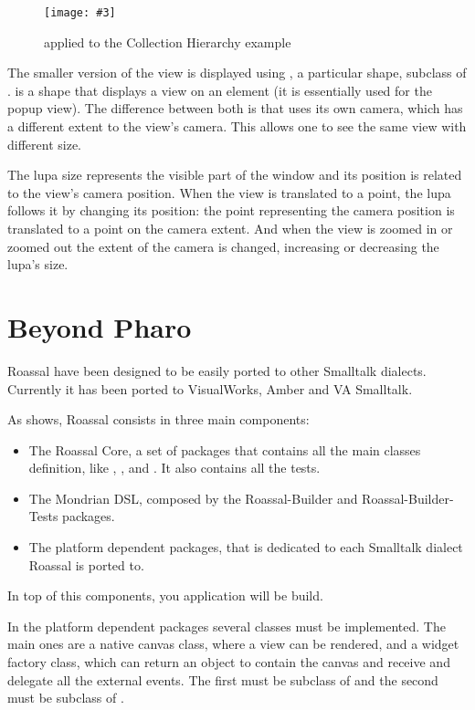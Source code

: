 \documentclass[a4paper,10pt,twoside]{book}
\newcommand{\fig}[4]{
		\begin{figure}[#1]
			\centering
			\texttt{[image: \#3]}
			\caption{\label{fig:#3}#4}
		\end{figure}}
\begin{document}
\fig{H}{0.9}{miniMap}{ applied to the Collection Hierarchy example}

The smaller version of the view is displayed using , a particular shape, subclass of . 
 is a shape that displays a view on an element (it is essentially used for the popup view). The difference between both is that  uses its own camera, which has a different extent to the view's camera. This allows one to see the same view with different size. 

The lupa size represents the visible part of the window and its position is related to the view's camera position. When the view is translated to a point, the lupa follows it by changing its position: the point representing the camera position is translated to a point on the  camera extent. And when the view is zoomed in or zoomed out the extent of the camera is changed, increasing or decreasing the lupa's size.




\section{Beyond Pharo}

Roassal have been designed to be easily ported to other Smalltalk dialects. Currently it has been ported to VisualWorks, Amber and VA Smalltalk.

As  shows, Roassal consists in three main components:

\begin{itemize}
\item  The Roassal Core, a set of packages that contains all the main classes definition, like , ,  and . It also contains all the tests.
\item The Mondrian DSL, composed by the Roassal-Builder and Roassal-Builder-Tests packages.
\item The platform dependent packages, that is dedicated to each Smalltalk dialect Roassal is ported to.
\end{itemize} 

In top of this components, you application will be build.

In the platform dependent packages several classes must be implemented. The main ones are a native canvas class, where a view can be rendered, and a widget factory class, which can return an object to contain the canvas and receive and delegate all the external events.
The first must be subclass of  and the second must be subclass of .
\end{document}
